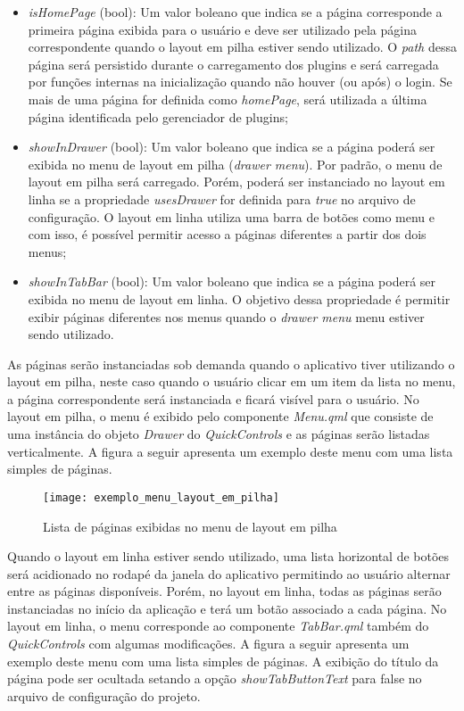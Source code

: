 \begin{itemize}
	\item \textit{isHomePage} (bool): Um valor boleano que indica se a página corresponde a primeira página exibida para o usuário e deve ser utilizado pela página correspondente quando o layout em pilha estiver sendo utilizado. O \textit{path} dessa página será persistido durante o carregamento dos plugins e será carregada por funções internas na inicialização quando não houver (ou após) o login. Se mais de uma página for definida como \textit{homePage}, será utilizada a última página identificada pelo gerenciador de plugins;

	\item \textit{showInDrawer} (bool): Um valor boleano que indica se a página poderá ser exibida no menu de layout em pilha (\textit{drawer menu}). Por padrão, o menu de layout em pilha será carregado. Porém, poderá ser instanciado no layout em linha se a propriedade \textit{usesDrawer} for definida para \textit{true} no arquivo de configuração. O layout em linha utiliza uma barra de botões como menu e com isso, é possível permitir acesso a páginas diferentes a partir dos dois menus;

	\item \textit{showInTabBar} (bool): Um valor boleano que indica se a página poderá ser exibida no menu de layout em linha. O objetivo dessa propriedade é permitir exibir páginas diferentes nos menus quando o \textit{drawer menu} menu estiver sendo utilizado.
\end{itemize}

As páginas serão instanciadas sob demanda quando o aplicativo tiver utilizando o layout em pilha, neste caso quando o usuário clicar em um item da lista no menu, a página correspondente será instanciada e ficará visível para o usuário. No layout em pilha, o menu é exibido pelo componente \textit{Menu.qml} que consiste de uma instância do objeto \textit{Drawer} do \textit{QuickControls} e as páginas serão listadas verticalmente. A figura a seguir apresenta um exemplo deste menu com uma lista simples de páginas.

\begin{figure}[H]
	\texttt{[image: exemplo\_menu\_layout\_em\_pilha]}
	\centering
	\caption{Lista de páginas exibidas no menu de layout em pilha}
\end{figure}

Quando o layout em linha estiver sendo utilizado, uma lista horizontal de botões será acidionado no rodapé da janela do aplicativo permitindo ao usuário alternar entre as páginas disponíveis. Porém, no layout em linha, todas as páginas serão instanciadas no início da aplicação e terá um botão associado a cada página. No layout em linha, o menu corresponde ao componente \textit{TabBar.qml} também do \textit{QuickControls} com algumas modificações. A figura a seguir apresenta um exemplo deste menu com uma lista simples de páginas. A exibição do título da página pode ser ocultada setando a opção \textit{showTabButtonText} para false no arquivo de configuração do projeto.

